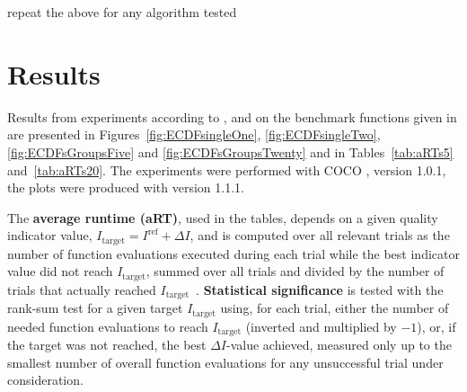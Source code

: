 \documentclass{sig-alternate}
\newcommand{\DI}{\ensuremath{\Delta I}}
\newcommand{\Itarget}{\ensuremath{I_\mathrm{target}}}
\newcommand{\change}[1]{{\color{red} #1}}
\newcommand{\hvref}{I^{\mathrm{ref}}}
\begin{document}
\change{repeat the above for any algorithm tested}

\section{Results}

Results from experiments according to \cite{hansen2016exp},
\cite{hansen2016perfass} and \cite{biobj2016perfass} on the benchmark
functions given in \cite{biobj2016func} are presented in
Figures~\ref{fig:ECDFsingleOne}, \ref{fig:ECDFsingleTwo}, \ref{fig:ECDFsGroupsFive} and
\ref{fig:ECDFsGroupsTwenty} and in Tables~\ref{tab:aRTs5} and~\ref{tab:aRTs20}.
The experiments were performed with COCO \cite{hansen2016cocoplat}, version
\change{1.0.1}, the plots were produced with version \change{1.1.1}.

The \textbf{average runtime (aRT)}, used in the %
tables,
depends on a given quality indicator value, $\Itarget=\hvref+\DI$, and is
computed over all relevant trials as the number of function
evaluations executed during each trial while the best indicator value
did not reach \Itarget, summed over all trials and divided by the
number of trials that actually reached \Itarget\
\cite{hansen2016exp,price1997dev}.  \textbf{Statistical significance}
is tested with the rank-sum test for a given target $\Itarget$
using, for each trial,
either the number of needed function evaluations to reach
$\Itarget$ (inverted and multiplied by $-1$), or, if the target
was not reached, the best $\DI$-value achieved, measured only up to
the smallest number of overall function evaluations for any
unsuccessful trial under consideration.




\end{document}
